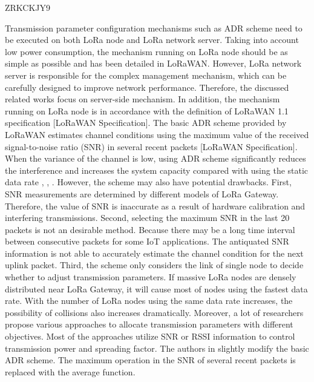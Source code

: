 


\cite{zhou_novel_2019} ZRKCKJY9

Transmission parameter configuration mechanisms such as ADR scheme need to be executed on both LoRa node and LoRa network server.
Taking into account low power consumption,
	the mechanism running on LoRa node should be as simple as possible and has been detailed in LoRaWAN.
However,
	LoRa network server is responsible for the complex management mechanism,
	which can be carefully designed to improve network performance.
Therefore,
	the discussed related works focus on server-side mechanism.
In addition,
	the mechanism running on LoRa node is in accordance with the definition of LoRaWAN 1.1 specification [LoRaWAN Speciﬁcation].
The basic ADR scheme provided by LoRaWAN estimates channel conditions using the maximum value of the received signal-to-noise ratio (SNR) in several recent packets [LoRaWAN Speciﬁcation].
When the variance of the channel is low,
	using ADR scheme significantly reduces the interference and increases the system capacity compared with using the static data rate \cite{bor_lora_2016},
	\cite{slabicki_adaptive_2018},
	\cite{zheng_smdp-based_2015}.
However,
	the scheme may also have potential drawbacks.
First,
	SNR measurements are determined by different models of LoRa Gateway.
Therefore,
	the value of SNR is inaccurate as a result of hardware calibration and interfering transmissions.
Second,
	selecting the maximum SNR in the last 20 packets is not an desirable method.
Because there may be a long time interval between consecutive packets for some IoT applications.
The antiquated SNR information is not able to accurately estimate the channel condition for the next uplink packet.
Third,
	the scheme only considers the link of single node to decide whether to adjust transmission parameters.
If massive LoRa nodes are densely distributed near LoRa Gateway,
	it will cause most of nodes using the fastest data rate.
With the number of LoRa nodes using the same data rate increases,
	the possibility of collisions also increases dramatically.
Moreover,
	a lot of researchers propose various approaches to allocate transmission parameters with different objectives.
Most of the approaches utilize SNR or RSSI information to control transmission power and spreading factor.
The authors in \cite{slabicki_adaptive_2018} slightly modify the basic ADR scheme.
The maximum operation in the SNR of several recent packets is replaced with the average function.

